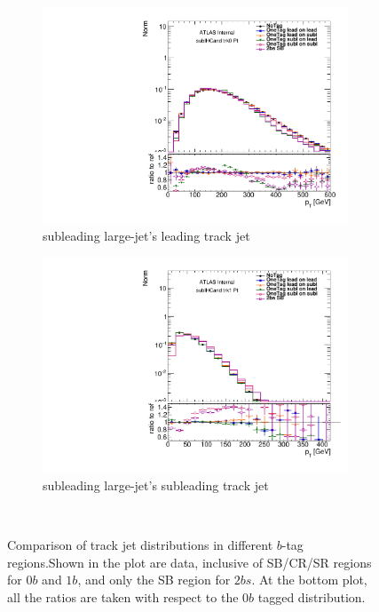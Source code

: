 \begin{figure}[htbp!]
    \begin{subfigure}[b]{0.4\textwidth}
        \includegraphics[width=\textwidth,angle=-90]{figures/boosted/Prereweight/2bs_directcompare_sublHCand_trk0_Pt_1.pdf}
        \caption{subleading large-\R jet's leading track jet \pt}
        \label{fig:rw-2bs-comp-subl0}
    \end{subfigure}
    \quad \quad 
    \begin{subfigure}[b]{0.4\textwidth}
        \includegraphics[width=\textwidth,angle=-90]{figures/boosted/Prereweight/2bs_directcompare_sublHCand_trk1_Pt_1.pdf}
        \caption{subleading large-\R jet's subleading track jet \pt}
        \label{fig:rw-2bs-comp-subl1}
    \end{subfigure} \\ 
   \caption{
   Comparison of track jet \pt distributions in different $b$-tag regions.Shown in the plot are data, inclusive of SB/CR/SR regions for $0b$ and $1b$, and only the SB region for $2bs$. At the bottom plot, all the ratios are taken with respect to the $0b$ tagged distribution.}
  \label{fig:rw-2bs-comp}
\end{figure}


